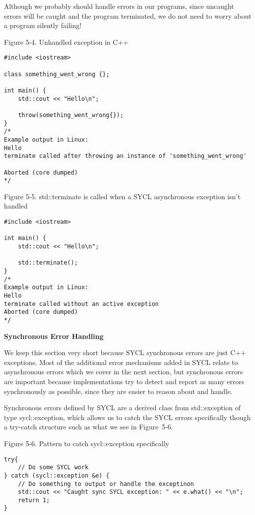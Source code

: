 Although we probably should handle errors in our programs, since uncaught errors will be caught and the program terminated, we do not need to worry about a program silently failing!\par

\hspace*{\fill} \par %
Figure 5-4. Unhandled exception in C++
\begin{lstlisting}[caption={}]
#include <iostream>

class something_went_wrong {};

int main() {
	std::cout << "Hello\n";
	
	throw(something_went_wrong{});
}
/*
Example output in Linux:
Hello
terminate called after throwing an instance of 'something_went_wrong'

Aborted (core dumped)
*/
\end{lstlisting}

\hspace*{\fill} \par %
Figure 5-5. std::terminate is called when a SYCL asynchronous exception isn’t handled
\begin{lstlisting}[caption={}]
#include <iostream>

int main() {
	std::cout << "Hello\n";
	
	std::terminate();
}
/*
Example output in Linux:
Hello
terminate called without an active exception
Aborted (core dumped)
*/
\end{lstlisting}

\hspace*{\fill} \par %
\textbf{Synchronous Error Handling}

We keep this section very short because SYCL synchronous errors are just C++ exceptions. Most of the additional error mechanisms added in SYCL relate to asynchronous errors which we cover in the next section, but synchronous errors are important because implementations try to detect and report as many errors synchronously as possible, since they are easier to reason about and handle.\par

Synchronous errors defined by SYCL are a derived class from std::exception of type sycl::exception, which allows us to catch the SYCL errors specifically though a try-catch structure such as what we see in Figure 5-6.\par

\hspace*{\fill} \par %
Figure 5-6. Pattern to catch sycl::exception specifically
\begin{lstlisting}[caption={}]
try{
	// Do some SYCL work
} catch (sycl::exception &e) {
	// Do something to output or handle the exceptinon 
	std::cout << "Caught sync SYCL exception: " << e.what() << "\n";
	return 1;
} 
\end{lstlisting}

